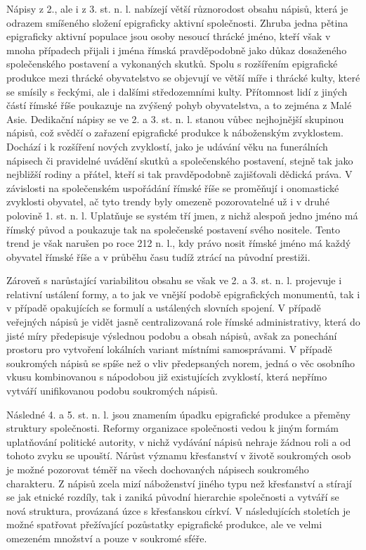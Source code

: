 Nápisy z 2., ale i z 3. st. n. l. nabízejí větší různorodost obsahu nápisů, která je odrazem smíšeného složení epigraficky aktivní společnosti. Zhruba jedna pětina epigraficky aktivní populace jsou osoby nesoucí thrácké jméno, kteří však v mnoha případech přijali i jména římská pravděpodobně jako důkaz dosaženého společenského postavení a vykonaných skutků. Spolu s rozšířením epigrafické produkce mezi thrácké obyvatelstvo se objevují ve větší míře i thrácké kulty, které se smísily s řeckými, ale i dalšími středozemními kulty. Přítomnost lidí z jiných částí římské říše poukazuje na zvýšený pohyb obyvatelstva, a to zejména z Malé Asie. Dedikační nápisy se ve 2. a 3. st. n. l. stanou vůbec nejhojnější skupinou nápisů, což svědčí o zařazení epigrafické produkce k náboženským zvyklostem. Dochází i k rozšíření nových zvyklostí, jako je udávání věku na funerálních nápisech či pravidelné uvádění skutků a společenského postavení, stejně tak jako nejbližší rodiny a přátel, kteří si tak pravděpodobně zajišťovali dědická práva. V závislosti na společenském uspořádání římské říše se proměňují i onomastické zvyklosti obyvatel, ač tyto trendy byly omezeně pozorovatelné už i v druhé polovině 1. st. n. l. Uplatňuje se systém tří jmen, z nichž alespoň jedno jméno má římský původ a poukazuje tak na společenské postavení svého nositele. Tento trend je však narušen po roce 212 n. l., kdy právo nosit římské jméno má každý obyvatel římské říše a v průběhu času tudíž ztrácí na původní prestiži.

Zároveň s narůstající variabilitou obsahu se však ve 2. a 3. st. n. l. projevuje i relativní ustálení formy, a to jak ve vnější podobě epigrafických monumentů, tak i v případě opakujících se formulí a ustálených slovních spojení. V případě veřejných nápisů je vidět jasně centralizovaná role římské administrativy, která do jisté míry předepisuje výslednou podobu a obsah nápisů, avšak za ponechání prostoru pro vytvoření lokálních variant místními samosprávami. V případě soukromých nápisů se spíše než o vliv předepsaných norem, jedná o věc osobního vkusu kombinovanou s nápodobou již existujících zvyklostí, která nepřímo vytváří unifikovanou podobu soukromých nápisů.

Následné 4. a 5. st. n. l. jsou znamením úpadku epigrafické produkce a přeměny struktury společnosti. Reformy organizace společnosti vedou k jiným formám uplatňování politické autority, v nichž vydávání nápisů nehraje žádnou roli a od tohoto zvyku se upouští. Nárůst významu křesťanství v životě soukromých osob je možné pozorovat téměř na všech dochovaných nápisech soukromého charakteru. Z nápisů zcela mizí náboženství jiného typu než křesťanství a stírají se jak etnické rozdíly, tak i zaniká původní hierarchie společnosti a vytváří se nová struktura, provázaná úzce s křesťanskou církví. V následujících stoletích je možné spatřovat přežívající pozůstatky epigrafické produkce, ale ve velmi omezeném množství a pouze v soukromé sféře.

